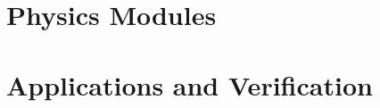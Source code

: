 \documentclass[11pt,twoside,openright]{book}
\theoremstyle{plain}
\theoremstyle{definition}
\theoremstyle{remark}
\begin{document}
\part{Physics Modules}
\label{part:physics}






\part{Applications and Verification}
\label{part:applications}





\backmatter




\printindex
\end{document}
